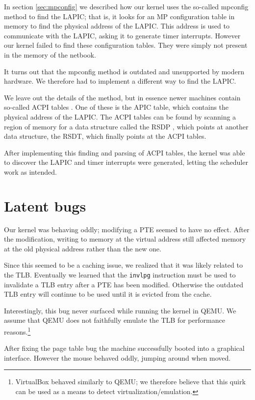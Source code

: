 \documentclass{report}
\begin{document}
In section \ref{sec:mpconfig} we described how our kernel uses the so-called
mpconfig method to find the LAPIC; that is, it looks for an MP
configuration table in memory to find the physical address of the LAPIC. This
address is used to communicate with the LAPIC, asking it to generate timer
interrupts. However our kernel failed to find these configuration tables. They
were simply not present in the memory of the netbook.

It turns out that the mpconfig method is outdated and unsupported by
modern hardware. We therefore had to implement a different way to find the
LAPIC.

We leave out the details of the method, but in essence newer machines contain
so-called ACPI tables \cite{symm}. One of these is the APIC table, which
contains the physical address of the LAPIC. The ACPI tables can be found by
scanning a region of memory for a data structure called the RSDP \cite{rsdp},
which points at another data structure, the RSDT, which finally points at the
ACPI tables.

After implementing this finding and parsing of ACPI tables, the kernel was
able to discover the LAPIC and timer interrupts were generated, letting the
scheduler work as intended.


\section{Latent bugs}
Our kernel was behaving oddly; modifying a PTE seemed to have no effect.
After the modification, writing to memory at the virtual address still
affected memory at the old physical address rather than the new one.

Since this seemed to be a caching issue, we realized that it was likely
related to the TLB. Eventually we learned that the \texttt{invlpg}
instruction must be used to invalidate a TLB entry after a PTE has
been modified. Otherwise the outdated TLB entry will continue to be used
until it is evicted from the cache.

Interestingly, this bug never surfaced while running the kernel in QEMU. We
assume that QEMU does not faithfully emulate the TLB for performance
reasons.\footnote{VirtualBox behaved similarly to QEMU; we therefore believe
that this quirk can be used as a means to detect virtualization/emulation.}

After fixing the page table bug the machine successfully booted into a
graphical interface. However the mouse behaved oddly, jumping around when
moved.
\end{document}
